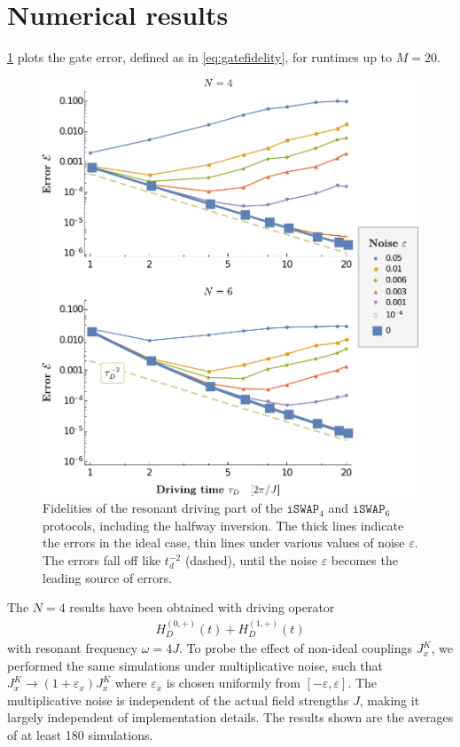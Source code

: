 \section{Numerical results} 
\cref{fig:N4N6fidelities} plots the gate error, defined as in \cref{eq:gatefidelity}, for runtimes up to $M=20$.
%
\begin{figure}
  \begin{center}
    \includegraphics[width=.73 \textwidth]{drive_fids_n4_n6.pdf}
  \end{center}
  \caption{Fidelities of the resonant driving part of the $\texttt{iSWAP}_4$ and $\texttt{iSWAP}_6$ protocols, including the halfway inversion. The thick lines indicate the errors in the ideal case, thin lines under various values of noise $\varepsilon$. The errors fall off like $t_d^{-2}$ (dashed), until the noise $\varepsilon$ becomes the leading source of errors.}
\label{fig:N4N6fidelities}
\end{figure} 
%
The $N=4$ results have been obtained with driving operator 
\begin{align}
H^{(0,+)}_D(t) + H^{(1,+)}_D(t)
\end{align}
with resonant frequency $\omega=4J$. To probe the effect of non-ideal couplings $J_x^K$, we performed the same simulations under multiplicative noise, such that $J_x^K \rightarrow (1+ \varepsilon_x) J_x^K$ where $\varepsilon_x$ is chosen uniformly from $[-\varepsilon, \varepsilon]$. The multiplicative noise is independent of the actual field strengths $J$, making it largely independent of implementation details. The results shown are the averages of at least 180 simulations. 

